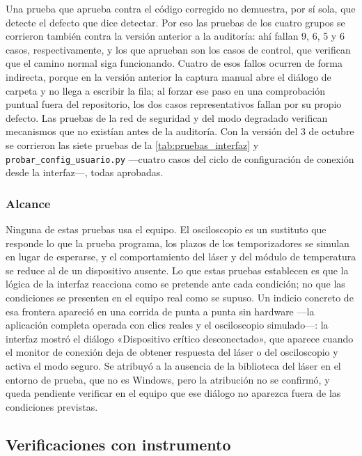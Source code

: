 Una prueba que aprueba contra el código corregido no demuestra, por sí
sola, que detecte el defecto que dice detectar. Por eso las pruebas de
los cuatro grupos se corrieron también contra la versión anterior a la
auditoría: ahí fallan 9, 6, 5 y 6 casos, respectivamente, y los que
aprueban son los casos de control, que verifican que el camino normal
siga funcionando. Cuatro de esos fallos ocurren de forma indirecta,
porque en la versión anterior la captura manual abre el diálogo de
carpeta y no llega a escribir la fila; al forzar ese paso en una
comprobación puntual fuera del repositorio, los dos casos
representativos fallan por su propio defecto. Las pruebas de la red de
seguridad y del modo degradado verifican mecanismos que no existían
antes de la auditoría. Con la versión del 3 de octubre se corrieron las siete
pruebas de la \cref{tab:pruebas_interfaz} y
\texttt{probar\_config\_usuario.py} ---cuatro casos del ciclo de
configuración de conexión desde la interfaz---, todas aprobadas.

\subsubsection*{Alcance}

Ninguna de estas pruebas usa el equipo. El osciloscopio es un
sustituto que responde lo que la prueba programa, los plazos de los
temporizadores se simulan en lugar de esperarse, y el comportamiento
del láser y del módulo de temperatura se reduce al de un dispositivo
ausente. Lo que estas pruebas establecen es que la lógica de la
interfaz reacciona como se pretende ante cada condición; no que las
condiciones se presenten en el equipo real como se supuso. Un indicio
concreto de esa frontera apareció en una corrida de punta a punta sin
hardware ---la aplicación completa operada con clics reales y el
osciloscopio simulado---: la
interfaz mostró el diálogo «Dispositivo crítico desconectado», que
aparece cuando el monitor de conexión deja de obtener respuesta del
láser o del osciloscopio y activa el modo seguro. Se atribuyó a la
ausencia de la biblioteca del láser en el entorno de prueba, que no es
Windows, pero la atribución no se confirmó, y queda pendiente
verificar en el equipo que ese diálogo no aparezca fuera de las
condiciones previstas.

\subsection{Verificaciones con instrumento}
\label{sec:val_instrumento}

